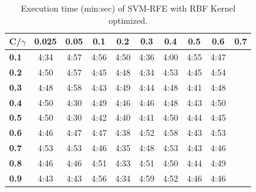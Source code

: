 \begin{table}[h]
    \centering
    \begin{tabular}{l | c c c|c c c|c c c}
        \toprule
        \multicolumn{1}{c}{\textbf{C/$\gamma$}} & \textbf{0.025} & \textbf{0.05} & \textbf{0.1} & \textbf{0.2} & \textbf{0.3} & \textbf{0.4} & \textbf{0.5} & \textbf{0.6} & \textbf{0.7} \\
        \midrule
        \textbf{0.1} & 4:34 & 4:57 & 4:56 & 4:50 & 4:36 & 4:00 & 4:55 & 4:47 & \\
        \textbf{0.2} & 4:50 & 4:57 & 4:45 & 4:48 & 4:34 & 4:53 & 4:45 & 4:54 & \\
        \textbf{0.3} & 4:48 & 4:58 & 4:43 & 4:49 & 4:44 & 4:48 & 4:41 & 4:48 & \\
        \textbf{0.4} & 4:50 & 4:30 & 4:49 & 4:46 & 4:46 & 4:48 & 4:43 & 4:50 & \\
        \textbf{0.5} & 4:50 & 4:30 & 4:42 & 4:40 & 4:41 & 4:50 & 4:44 & 4:45 & \\
        \textbf{0.6} & 4:46 & 4:47 & 4:47 & 4:38 & 4:52 & 4:58 & 4:43 & 4:53 & \\
        \textbf{0.7} & 4:53 & 4:53 & 4:46 & 4:35 & 4:48 & 4:53 & 4:43 & 4:46 & \\
        \textbf{0.8} & 4:46 & 4:46 & 4:51 & 4:33 & 4:51 & 4:50 & 4:44 & 4:49 & \\
        \textbf{0.9} & 4:43 & 4:43 & 4:56 & 4:34 & 4:59 & 4:52 & 4:46 & 4:46 & \\
        \bottomrule
        \end{tabular}
    \caption{Execution time (min:sec) of SVM-RFE with RBF Kernel optimized.}
\end{table}